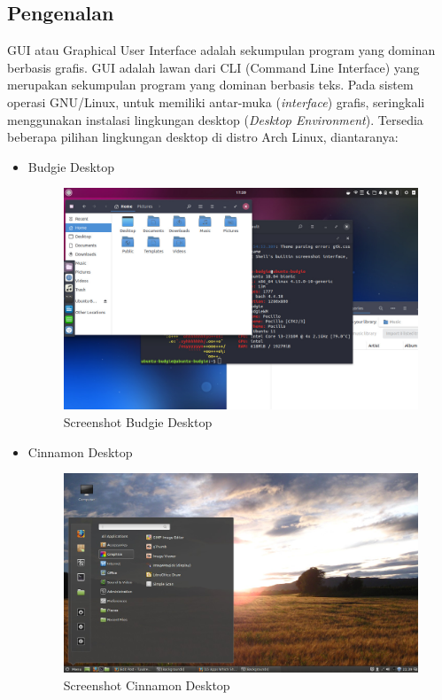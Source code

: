 \documentclass[12pt,]{article}
\begin{document}
	\subsection{Pengenalan}
	GUI atau Graphical User Interface adalah sekumpulan program yang dominan berbasis grafis.
	GUI adalah lawan dari CLI (Command Line Interface) yang merupakan sekumpulan program yang dominan berbasis teks.
	Pada sistem operasi GNU/Linux, untuk memiliki antar-muka (\textit{interface}) grafis,
	seringkali menggunakan instalasi lingkungan desktop (\textit{Desktop Environment}).
	Tersedia beberapa pilihan lingkungan desktop di distro Arch Linux, diantaranya:
	\begin{itemize}
		\item Budgie Desktop
		\begin{figure}[H]
			\centering
			\includegraphics[width=0.8\linewidth]{images/vbox_de/budgie}
			\caption{Screenshot Budgie Desktop}
		\end{figure}
	
		\item Cinnamon Desktop
		\begin{figure}[H]
			\centering
			\includegraphics[width=0.8\linewidth]{images/vbox_de/cinnamon}
			\caption{Screenshot Cinnamon Desktop}
		\end{figure}
		

\end{itemize}
\end{document}
